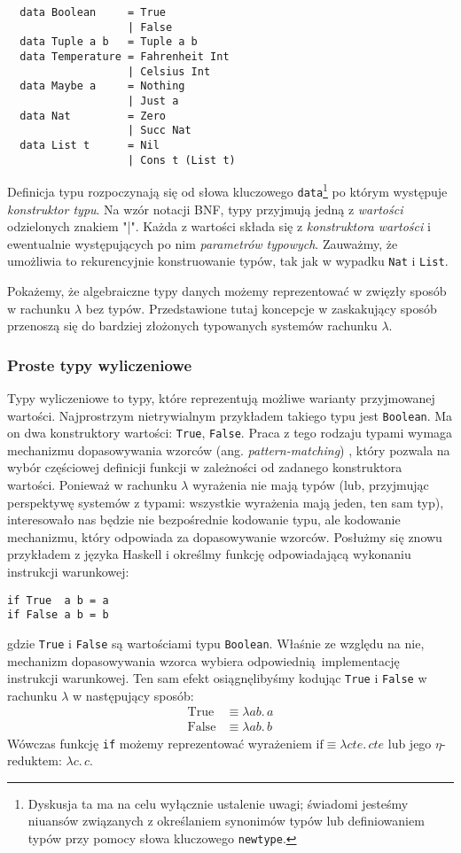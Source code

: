\begin{verbatim}
  data Boolean     = True
                   | False
  data Tuple a b   = Tuple a b
  data Temperature = Fahrenheit Int
                   | Celsius Int
  data Maybe a     = Nothing
                   | Just a
  data Nat         = Zero
                   | Succ Nat
  data List t      = Nil
                   | Cons t (List t)
\end{verbatim}
Definicja typu rozpoczynają się od słowa kluczowego \texttt{data}\footnote{Dyskusja ta ma na celu wyłącznie ustalenie uwagi; świadomi jesteśmy niuansów związanych z określaniem synonimów typów lub definiowaniem typów przy pomocy słowa kluczowego \texttt{newtype}.} po którym występuje \emph{konstruktor typu}. Na wzór notacji BNF, typy przyjmują jedną z \emph{wartości} odzielonych znakiem "|". Każda z wartości składa się z \emph{konstruktora wartości} i ewentualnie występujących po nim \emph{parametrów typowych}. Zauważmy, że umożliwia to rekurencyjnie konstruowanie typów, tak jak w wypadku \texttt{Nat} i \texttt{List}.

Pokażemy, że algebraiczne typy danych możemy reprezentować w zwięzły sposób w rachunku \(\lambda\) bez typów. Przedstawione tutaj koncepcje w zaskakujący sposób przenoszą się do bardziej złożonych typowanych systemów rachunku \(\lambda\).

\subsubsection{Proste typy wyliczeniowe}\label{ref:untyped_simple_enumeration}
Typy wyliczeniowe to typy, które reprezentują możliwe warianty przyjmowanej wartości. Najprostrzym nietrywialnym przykładem takiego typu jest \texttt{Boolean}. Ma on dwa konstruktory wartości: \texttt{True}, \texttt{False}. Praca z tego rodzaju typami wymaga mechanizmu dopasowywania wzorców (ang. \emph{pattern-matching}) \cite[Rozdział IV]{PeytonJones:1992:IFL:129390}, który pozwala na wybór częściowej definicji funkcji w zależności od zadanego konstruktora wartości. Ponieważ w rachunku \(\lambda\) wyrażenia nie mają typów (lub, przyjmując perspektywę systemów z typami: wszystkie wyrażenia mają jeden, ten sam typ), interesowało nas będzie nie bezpośrednie kodowanie typu, ale kodowanie mechanizmu, który odpowiada za dopasowywanie wzorców. Posłużmy się znowu przykładem z języka Haskell i określmy funkcję odpowiadającą wykonaniu instrukcji warunkowej:
\begin{verbatim}
if True  a b = a
if False a b = b
\end{verbatim}
gdzie \texttt{True} i \texttt{False} są wartościami typu \texttt{Boolean}. Właśnie ze względu na nie, mechanizm dopasowywania wzorca wybiera odpowiednią implementację instrukcji warunkowej. Ten sam efekt osiągnęlibyśmy kodując \texttt{True} i \texttt{False} w rachunku \(\lambda\) w następujący sposób:
\begin{align*}
  \mathrm{True} &\equiv \lambda a b.\,a\\
  \mathrm{False} &\equiv \lambda a b.\,b
\end{align*}
Wówczas funkcję \texttt{if} możemy reprezentować wyrażeniem \(\mathrm{if}\equiv\lambda c t e.\, cte\) lub jego \(\eta\)-reduktem: \(\lambda c.\,c\).

